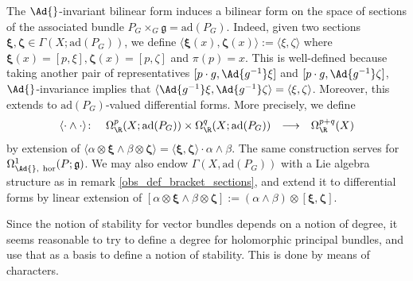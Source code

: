 {\begin{obs} \label{obs_def_prod}
    The \(\Ad{}\)-invariant bilinear form induces a bilinear form on the space of sections of the associated bundle \(P_G \times _G \mathfrak{g}=\mathrm{ad}(P_G)\). Indeed, given two sections \(\bm{\xi}, \bm{\zeta}\in \Gamma(X; \mathrm{ad}(P_G))\), we define \(\langle \bm{\xi}(x), \bm{\zeta}(x)\rangle :=\langle \xi, \zeta \rangle\) where \(\bm{\xi}(x)=[p, \xi], \bm{\zeta}(x)=[p, \zeta]\) and \(\pi(p)=x\). This is well-defined because taking another pair of representatives \([p\cdot g, \Ad{g^{-1}}\xi]\) and \([p\cdot g, \Ad{g^{-1}}\zeta]\), \(\Ad{}\)-invariance implies that \(\langle \Ad{g^{-1}}\xi, \Ad{g^{-1}}\zeta \rangle = \langle \xi, \zeta\rangle\). Moreover, this extends to \(\mathrm{ad}(P_G)\)-valued differential forms. More precisely, we define 
    \[
    \begin{array}{cccc}
        \langle \cdot \wedge \cdot \rangle \colon & \Omega_\R^p(X; \mathrm{ad}(P_G)) \times \Omega_\R^q(X; \mathrm{ad}(P_G)) & \longrightarrow & \Omega_\R^{p+q}(X) \\ 
    \end{array}
    \]
    by extension of \(\langle \alpha \otimes \bm{\xi} \wedge \beta \otimes \bm{\zeta}\rangle = \langle \bm{\xi}, \bm{\zeta}\rangle \cdot \alpha \wedge \beta\). The same construction serves for \(\Omega_{\Ad{}, \ \mathrm{hor}}^1(P;\mathfrak{g})\). We may also endow \(\Gamma(X, \mathrm{ad}(P_G))\) with a Lie algebra structure as in remark \ref{obs_def_bracket_sections}, and extend it to differential forms by linear extension of \([\alpha \otimes \bm{\xi} \wedge \beta \otimes \bm{\zeta}]:=(\alpha \wedge \beta)\otimes [\bm{\xi}, \bm{\zeta}]\).
\end{obs}

Since the notion of stability for vector bundles depends on a notion of degree, it seems reasonable to try to define a degree for holomorphic principal bundles, and use that as a basis to define a notion of stability. This is done by means of characters.

}
